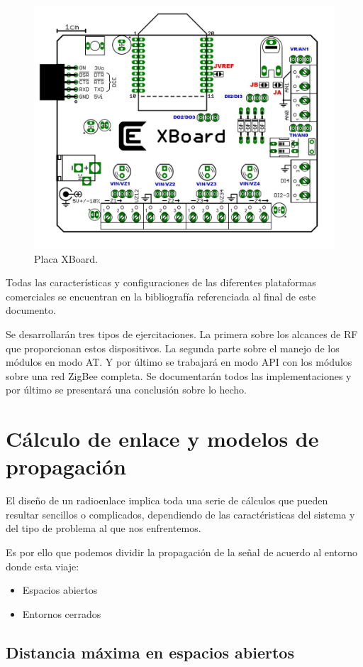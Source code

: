 \documentclass[11pt,oneside,spanish,a4paper]{article}
\begin{document}
\begin{figure}[ht]
  \centering
  \includegraphics[width=.6\textwidth]{img/xboard}
  \caption{Placa XBoard.}
  \label{fig:xboard}
\end{figure}

Todas las características y configuraciones de las diferentes
plataformas comerciales  se encuentran en la bibliografía referenciada
al final de este documento. 

Se desarrollarán tres tipos de ejercitaciones. La primera sobre los
alcances de RF que proporcionan estos dispositivos. La segunda parte
sobre el manejo de los módulos en modo AT. Y por último se trabajará
en modo API con los módulos sobre una red ZigBee completa. Se
documentarán todos las implementaciones y por último se presentará una
conclusión sobre lo hecho.

\section{C\'alculo de enlace y modelos de propagaci\'on}
\label{S:1}

El dise\~no de un radioenlace implica toda una serie de c\'alculos que pueden resultar sencillos o complicados, dependiendo de las caract\'eristicas del sistema y del tipo de problema al que nos enfrentemos.

Es por ello que podemos dividir la propagaci\'on de la se\~nal de acuerdo al entorno donde esta viaje: 

\begin{itemize}
\item Espacios abiertos 
\item Entornos cerrados
\end{itemize}


\subsection{Distancia m\'axima en espacios abiertos}
\end{document}
